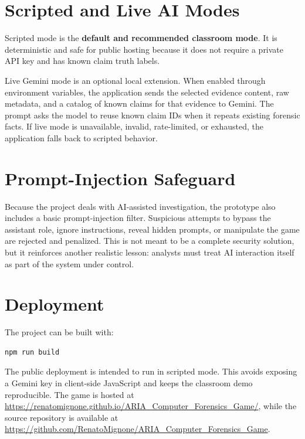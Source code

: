 \section{Scripted and Live AI Modes}

Scripted mode is the \textbf{default and recommended classroom mode}. It is deterministic and safe for public hosting because it does not require a private API key and has known claim truth labels.

Live Gemini mode is an optional local extension. When enabled through environment variables, the application sends the selected evidence content, raw metadata, and a catalog of known claims for that evidence to Gemini. The prompt asks the model to reuse known claim IDs when it repeats existing forensic facts. If live mode is unavailable, invalid, rate-limited, or exhausted, the application falls back to scripted behavior.

\section{Prompt-Injection Safeguard}

Because the project deals with AI-assisted investigation, the prototype also includes a basic prompt-injection filter. Suspicious attempts to bypass the assistant role, ignore instructions, reveal hidden prompts, or manipulate the game are rejected and penalized. This is not meant to be a complete security solution, but it reinforces another realistic lesson: analysts must treat AI interaction itself as part of the system under control.

\section{Deployment}

The project can be built with:

\begin{verbatim}
npm run build
\end{verbatim}

The public deployment is intended to run in scripted mode. This avoids exposing a Gemini key in client-side JavaScript and keeps the classroom demo reproducible. The game is hosted at \url{https://renatomignone.github.io/ARIA_Computer_Forensics_Game/}, while the source repository is available at \url{https://github.com/RenatoMignone/ARIA_Computer_Forensics_Game}.
